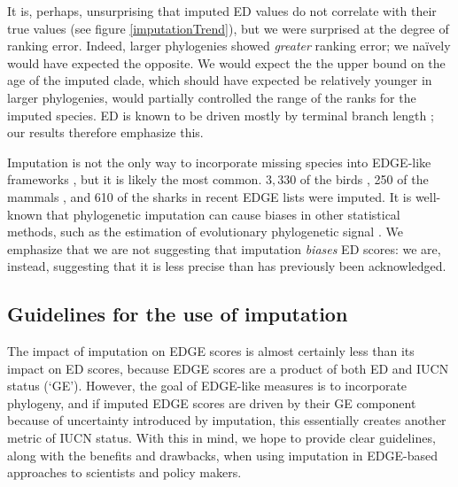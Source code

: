 \documentclass[10pt,english]{article}
\begin{document}
It is, perhaps, unsurprising that imputed ED values do not correlate with their
true values (see figure \ref{imputationTrend}), but we were surprised at the
degree of ranking error. Indeed, larger phylogenies showed \emph{greater}
ranking error; we na\"{i}vely would have expected the opposite. We would expect
the the upper bound on the age of the imputed clade, which should have expected
be relatively younger in larger phylogenies, would partially controlled the
range of the ranks for the imputed species. ED is known to be driven mostly by
terminal branch length \autocite{Isaac2007, Steel2007, Redding2008}; our results
therefore emphasize this.

Imputation is not the only way to incorporate missing species into EDGE-like
frameworks \autocite[see][]{Collen2011,Gumbs2018}, but it is likely the most
common. $3,330$ of the birds \autocite[\textasciitilde30\%;][]{Jetz2014}, 250 of
the mammals \autocite[\textasciitilde 5.6\%;][]{Collen2011}, and 610 of the
sharks \autocite[\textasciitilde49\%;][]{Stein2018} in recent EDGE lists were
imputed. It is well-known that phylogenetic imputation can cause biases in other
statistical methods, such as the estimation of evolutionary phylogenetic signal
\autocite{Rabosky2015}. We emphasize that we are not suggesting that imputation
\emph{biases} ED scores: we are, instead, suggesting that it is less precise
than has previously been acknowledged.

\subsection*{Guidelines for the use of imputation}
The impact of imputation on EDGE scores is almost certainly less than its impact
on ED scores, because EDGE scores are a product of both ED and IUCN status
(‘GE'). However, the goal of EDGE-like measures is to incorporate phylogeny, and
if imputed EDGE scores are driven by their GE component because of uncertainty
introduced by imputation, this essentially creates another metric of IUCN
status. With this in mind, we hope to provide clear guidelines, along
with the benefits and drawbacks, when using imputation in EDGE-based approaches
to scientists and policy makers.
\end{document}
